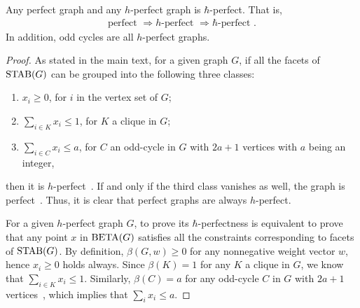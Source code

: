 \begin{theorem}\label{thm:perfect2}
    Any perfect graph and any $h$-perfect graph is $\hbar$-perfect. That is,
    \begin{align}
      \text{perfect }  \Rightarrow \text{$h$-perfect }  \Rightarrow \text{$\hbar$-perfect }.
    \end{align}
    In addition, odd cycles are all $h$-perfect graphs. 
\end{theorem}
\begin{proof}
As stated in the main text, for a given graph $G$, if all the facets of $\operatorname{STAB}(G)$ can be grouped into the following three classes:
    \begin{enumerate}
        \item $x_i \ge 0$, for $i$ in the vertex set of $G$;
        \item $\sum_{i\in K} x_i \le 1$, for $K$ a clique in $G$;
        \item $\sum_{i\in C} x_i \le a$, for $C$ an odd-cycle in $G$ with $2a+1$ vertices with $a$ being an integer,
     \end{enumerate}
    then it is $h$-perfect~\cite{chvatal1975certain,fonlupt1982transformations}. 
If and only if the third class vanishes as well, the graph is perfect~\cite{chvatal1975certain}. Thus, it is clear that perfect graphs are always $h$-perfect.

    For a given $h$-perfect graph $G$, to prove its $\hbar$-perfectness is equivalent to prove that any point $x$ in $\operatorname{BETA}(G)$ satisfies all the constraints corresponding to facets of $\operatorname{STAB}(G)$. 
    By definition, $\beta(G,w) \ge 0$ for any nonnegative weight vector $w$, hence $x_i \ge 0$ holds always.
    Since $\beta(K) = 1$ for any $K$ a clique in $G$, we know that $\sum_{i\in K} x_i \le 1$. Similarly, $\beta(C) = a$ for any odd-cycle $C$ in $G$ with $2a+1$ vertices~\cite{xu2023bounding}, which implies that $\sum_i x_i \le a$.
\end{proof}

